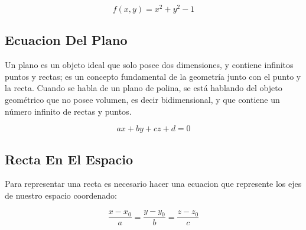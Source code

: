 \documentclass{article}
\begin{document}
\[
f(x,y) = x^2 + y^2 - 1
\]

\subsection{Ecuacion Del Plano}
\label{sec:org4cbfe07}
Un plano es un objeto ideal que solo posee dos dimensiones, y contiene infinitos puntos y rectas; es un concepto fundamental de la geometría junto con el punto y la recta. Cuando se habla de un plano de polina, se está hablando del objeto geométrico que no posee volumen, es decir bidimensional, y que contiene un número infinito de rectas y puntos. 

\[ax+by+cz+d=0\]

\subsection{Recta En El Espacio}
\label{sec:orgbcd75ab}
Para representar una recta es necesario hacer una ecuacion que represente los ejes de nuestro espacio coordenado:

\[
\frac{x-x_0}{a} = \frac{y-y_0}{b} = \frac{z-z_0}{c}
\]
\end{document}
